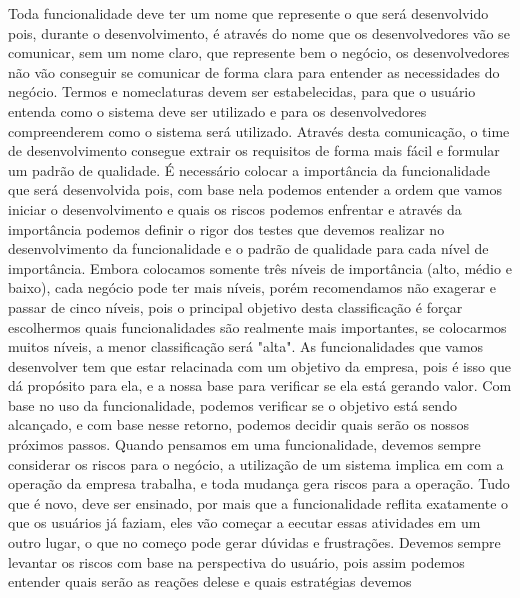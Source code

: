       Toda funcionalidade deve ter um nome que represente o que será desenvolvido
      pois, durante o desenvolvimento, é através do nome que os desenvolvedores
      vão se comunicar, sem um nome claro, que represente bem o negócio, os
      desenvolvedores não vão conseguir se comunicar de forma clara para entender
      as necessidades do negócio. Termos e nomeclaturas devem ser estabelecidas,
      para que o usuário entenda como o sistema deve ser utilizado e para os
      desenvolvedores compreenderem como o sistema será utilizado. Através desta
      comunicação, o time de desenvolvimento consegue extrair os requisitos de forma
      mais fácil e formular um padrão de qualidade. \newline
      É necessário colocar a importância da funcionalidade que será desenvolvida pois,
      com base nela podemos entender a ordem que vamos iniciar o desenvolvimento
      e quais os riscos podemos enfrentar e através da importância podemos definir
      o rigor dos testes que devemos realizar no desenvolvimento da funcionalidade
      e o padrão de qualidade para cada nível de importância. Embora colocamos
      somente três níveis de importância (alto, médio e baixo), cada negócio pode
      ter mais níveis, porém recomendamos não exagerar e passar de cinco níveis,
      pois o principal objetivo desta classificação é forçar escolhermos quais
      funcionalidades são realmente mais importantes, se colocarmos muitos níveis,
      a menor classificação será "alta". \newline
      As funcionalidades que vamos desenvolver tem que estar relacinada com um
      objetivo da empresa, pois é isso que dá propósito para ela, e a nossa base
      para verificar se ela está gerando valor. Com base no uso da funcionalidade,
      podemos verificar se o objetivo está sendo alcançado, e com base nesse
      retorno, podemos decidir quais serão os nossos próximos passos. \newline
      Quando pensamos em uma funcionalidade, devemos sempre considerar os riscos
      para o negócio, a utilização de um sistema implica em com a operação da
      empresa trabalha, e toda mudança gera riscos para a operação. Tudo que é
      novo, deve ser ensinado, por mais que a funcionalidade reflita exatamente o
      que os usuários já faziam, eles vão começar a eecutar essas atividades em
      um outro lugar, o que no começo pode gerar dúvidas e frustrações. Devemos
      sempre levantar os riscos com base na perspectiva do usuário, pois assim
      podemos entender quais serão as reações delese e quais estratégias devemos
